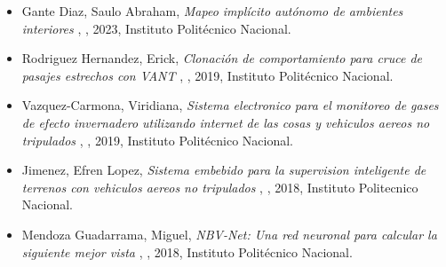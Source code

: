 \begin{itemize} 
\item Gante Diaz, Saulo Abraham, \textit{ Mapeo implícito autónomo de ambientes interiores }, \href{ https://jivg.org/wp-content/uploads/2023/02/2023_maestria_Gante.pdf }{\faFilePdfO}, 2023, Instituto Polit\'ecnico Nacional. 
\item Rodriguez Hernandez, Erick, \textit{ Clonaci\'on de comportamiento para cruce de pasajes estrechos con VANT }, \href{ https://jivasquez.files.wordpress.com/2019/08/tesiserhempastar.pdf }{\faFilePdfO}, 2019, Instituto Polit\'ecnico Nacional. 
\item Vazquez-Carmona, Viridiana, \textit{ Sistema electronico para el monitoreo de gases de efecto invernadero utilizando internet de las cosas y vehiculos aereos no tripulados }, \href{ https://jivasquez.files.wordpress.com/2020/09/2019_maestria_vazquez.pdf }{\faFilePdfO}, 2019, Instituto Polit\'ecnico Nacional. 
\item Jimenez, Efren Lopez, \textit{ Sistema embebido para la supervision inteligente de terrenos con vehiculos aereos no tripulados }, \href{ https://jivasquez.files.wordpress.com/2018/12/master_thesis_2018_lopez.pdf }{\faFilePdfO}, 2018, Instituto Politecnico Nacional. 
\item Mendoza Guadarrama, Miguel, \textit{ NBV-Net: Una red neuronal para calcular la siguiente mejor vista }, \href{ https://jivasquez.files.wordpress.com/2018/12/2018_maestria_Mendoza.pdf }{\faFilePdfO}, 2018, Instituto Politécnico Nacional. 
\end{itemize} 
